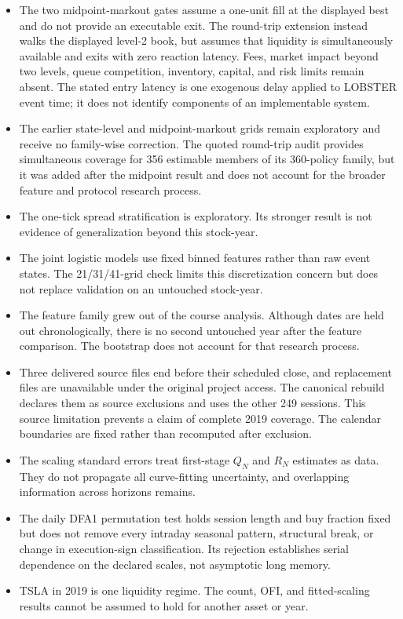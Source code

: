 \documentclass[11pt,a4paper]{article}
\begin{document}
\begin{itemize}
  new market regime.
  \item The two midpoint-markout gates assume a one-unit fill at the displayed
  best and do not provide an executable exit. The round-trip extension instead
  walks the displayed level-2 book, but assumes that liquidity is
  simultaneously available and exits with zero reaction latency. Fees, market
  impact beyond two levels, queue competition, inventory, capital, and risk
  limits remain absent. The stated entry latency is one exogenous delay applied
  to LOBSTER event time; it does not identify components of an implementable
  system.
  \item The earlier state-level and midpoint-markout grids remain exploratory
  and receive no family-wise correction. The quoted round-trip audit provides
  simultaneous coverage for 356 estimable members of its 360-policy family,
  but it was added after the midpoint result and does not account for the
  broader feature and protocol research process.
  \item The one-tick spread stratification is exploratory. Its stronger result
  is not evidence of generalization beyond this stock-year.
  \item The joint logistic models use fixed binned features rather than raw
  event states. The 21/31/41-grid check limits this discretization concern but
  does not replace validation on an untouched stock-year.
  \item The feature family grew out of the course analysis. Although dates are
  held out chronologically, there is no second untouched year after the feature
  comparison. The bootstrap does not account for that research process.
  \item Three delivered source files end before their scheduled close, and
  replacement files are unavailable under the original project access. The
  canonical rebuild declares them as source exclusions and uses the other 249
  sessions. This source limitation prevents a claim of complete 2019 coverage.
  The calendar boundaries are fixed rather than recomputed after exclusion.
  \item The scaling standard errors treat first-stage $Q_N$ and $R_N$ estimates
  as data. They do not propagate all curve-fitting uncertainty, and overlapping
  information across horizons remains.
  \item The daily DFA1 permutation test holds session length and buy fraction
  fixed but does not remove every intraday seasonal pattern, structural break,
  or change in execution-sign classification. Its rejection establishes
  serial dependence on the declared scales, not asymptotic long memory.
  \item TSLA in 2019 is one liquidity regime. The count, OFI, and fitted-scaling
  results cannot be assumed to hold for another asset or year.
\end{itemize}
\end{document}
